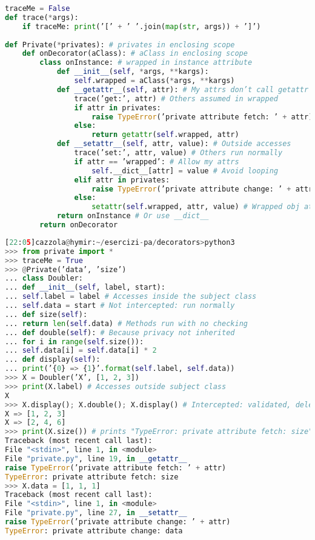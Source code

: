 \begin{lstlisting}[language=Python]
traceMe = False
def trace(*args):
	if traceMe: print(’[’ + ’ ’.join(map(str, args)) + ’]’)
	
def Private(*privates): # privates in enclosing scope
	def onDecorator(aClass): # aClass in enclosing scope
		class onInstance: # wrapped in instance attribute
			def __init__(self, *args, **kargs):
				self.wrapped = aClass(*args, **kargs)
			def __getattr__(self, attr): # My attrs don’t call getattr
				trace(’get:’, attr) # Others assumed in wrapped
				if attr in privates:
					raise TypeError(’private attribute fetch: ’ + attr)
				else:
					return getattr(self.wrapped, attr)
			def __setattr__(self, attr, value): # Outside accesses
				trace(’set:’, attr, value) # Others run normally
				if attr == ’wrapped’: # Allow my attrs
					self.__dict__[attr] = value # Avoid looping
				elif attr in privates:
					raise TypeError(’private attribute change: ’ + attr)
				else:
					setattr(self.wrapped, attr, value) # Wrapped obj attrs
			return onInstance # Or use __dict__
		return onDecorator
\end{lstlisting}

\begin{lstlisting}[language=Python]
[22:05]cazzola@hymir:~/esercizi-pa/decorators>python3
>>> from private import *
>>> traceMe = True
>>> @Private(’data’, ’size’)
... class Doubler:
... def __init__(self, label, start):
... self.label = label # Accesses inside the subject class
... self.data = start # Not intercepted: run normally
... def size(self):
... return len(self.data) # Methods run with no checking
... def double(self): # Because privacy not inherited
... for i in range(self.size()):
... self.data[i] = self.data[i] * 2
... def display(self):
... print(’{0} => {1}’.format(self.label, self.data))
>>> X = Doubler(’X’, [1, 2, 3])
>>> print(X.label) # Accesses outside subject class
X
>>> X.display(); X.double(); X.display() # Intercepted: validated, delegated
X => [1, 2, 3]
X => [2, 4, 6]
>>> print(X.size()) # prints "TypeError: private attribute fetch: size"
Traceback (most recent call last):
File "<stdin>", line 1, in <module>
File "private.py", line 19, in __getattr__
raise TypeError(’private attribute fetch: ’ + attr)
TypeError: private attribute fetch: size
>>> X.data = [1, 1, 1]
Traceback (most recent call last):
File "<stdin>", line 1, in <module>
File "private.py", line 27, in __setattr__
raise TypeError(’private attribute change: ’ + attr)
TypeError: private attribute change: data
\end{lstlisting}